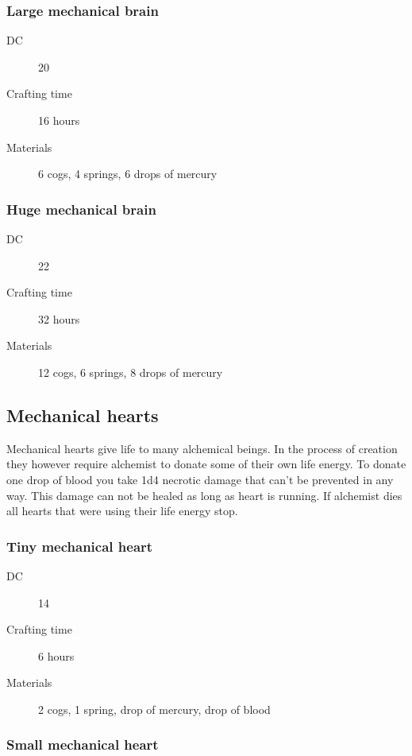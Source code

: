 \subsubsection{Large mechanical brain}

\begin{description}
\item [DC] 20 \arcana
\item [Crafting time] 16 hours
\item [Materials] 6 cogs, 4 springs, 6 drops of mercury
\end{description}

\subsubsection{Huge mechanical brain}

\begin{description}
\item [DC] 22 \arcana
\item [Crafting time] 32 hours
\item [Materials] 12 cogs, 6 springs, 8 drops of mercury
\end{description}

\subsection{Mechanical hearts}

Mechanical hearts give life to many alchemical beings. In the process of creation they however require alchemist to donate some of their own life energy.
To donate one drop of blood you take 1d4 necrotic damage that can't be prevented in any way. This damage can not be healed as long as heart is running. If
alchemist dies all hearts that were using their life energy stop.

\subsubsection{Tiny mechanical heart}

\begin{description}
\item [DC] 14 \arcana
\item [Crafting time] 6 hours
\item [Materials] 2 cogs, 1 spring, drop of mercury, drop of blood
\end{description}

\subsubsection{Small mechanical heart}

